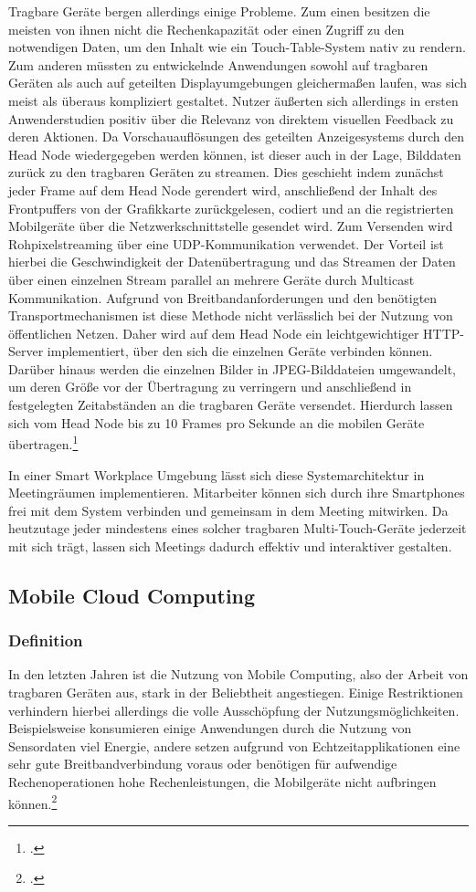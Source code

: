 Tragbare Geräte bergen allerdings einige Probleme. Zum einen besitzen die meisten von ihnen nicht die Rechenkapazität oder einen Zugriff zu den notwendigen Daten, um den Inhalt wie ein Touch-Table-System nativ zu rendern. Zum anderen müssten zu entwickelnde Anwendungen sowohl auf tragbaren Geräten als auch auf geteilten Displayumgebungen gleichermaßen laufen, was sich meist als überaus kompliziert gestaltet. Nutzer äußerten sich allerdings in ersten Anwenderstudien positiv über die Relevanz von direktem visuellen Feedback zu deren Aktionen. Da Vorschauauflösungen des geteilten Anzeigesystems durch den Head Node wiedergegeben werden können, ist dieser auch in der Lage, Bilddaten zurück zu den tragbaren Geräten zu streamen. Dies geschieht indem zunächst jeder Frame auf dem Head Node gerendert wird, anschließend der Inhalt des Frontpuffers von der Grafikkarte zurückgelesen, codiert und an die registrierten Mobilgeräte über die Netzwerkschnittstelle gesendet wird.
Zum Versenden wird Rohpixelstreaming über eine UDP-Kommunikation verwendet. Der Vorteil ist hierbei die Geschwindigkeit der Datenübertragung und das Streamen der Daten über einen einzelnen Stream parallel an mehrere Geräte durch Multicast Kommunikation. Aufgrund von Breitbandanforderungen und den benötigten Transportmechanismen ist diese Methode nicht verlässlich bei der Nutzung von öffentlichen Netzen. Daher wird auf dem Head Node ein leichtgewichtiger HTTP-Server implementiert, über den sich die einzelnen Geräte verbinden können. Darüber hinaus werden die einzelnen Bilder in JPEG-Bilddateien umgewandelt, um deren Größe vor der Übertragung zu verringern und anschließend in festgelegten Zeitabständen an die tragbaren Geräte versendet. Hierdurch lassen sich vom Head Node bis zu 10 Frames pro Sekunde an die mobilen Geräte übertragen.\footcite[Vgl.][Seite 652 f.]{Table}

In einer Smart Workplace Umgebung lässt sich diese Systemarchitektur in Meetingräumen implementieren. Mitarbeiter können sich durch ihre Smartphones frei mit dem System verbinden und gemeinsam in dem Meeting mitwirken. Da heutzutage jeder mindestens eines solcher tragbaren Multi-Touch-Geräte jederzeit mit sich trägt, lassen sich Meetings dadurch effektiv und interaktiver gestalten.

\subsection{Mobile Cloud Computing}
\subsubsection{Definition}
In den letzten Jahren ist die Nutzung von Mobile Computing, also der Arbeit von tragbaren Geräten aus, stark in der Beliebtheit angestiegen. Einige Restriktionen verhindern hierbei allerdings die volle Ausschöpfung der Nutzungsmöglichkeiten. Beispielsweise konsumieren einige Anwendungen durch die Nutzung von Sensordaten viel Energie, andere setzen aufgrund von Echtzeitapplikationen eine sehr gute Breitbandverbindung voraus oder benötigen für aufwendige Rechenoperationen hohe Rechenleistungen, die Mobilgeräte nicht aufbringen können.\footcite[Vgl.][Seite 84]{MCC}

